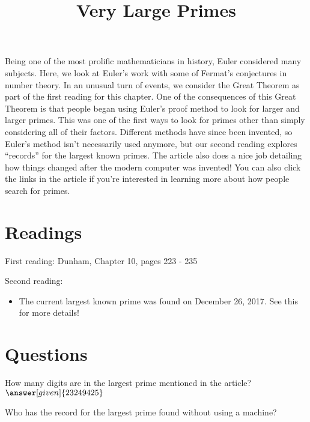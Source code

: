 \documentclass[nooutcomes]{ximera}
\title{Very Large Primes}
\begin{document}
\begin{abstract}
    
\end{abstract}
\maketitle

Being one of the most prolific mathematicians in history, Euler considered many subjects.  Here, we look at Euler's work with some of Fermat's conjectures in number theory.  In an unusual turn of events, we consider the Great Theorem as part of the first reading for this chapter.  One of the consequences of this Great Theorem is that people began using Euler's proof method to look for larger and larger primes.  This was one of the first ways to look for primes other than simply considering all of their factors.  Different methods have since been invented, so Euler's method isn't necessarily used anymore, but our second reading explores ``records'' for the largest known primes.  The article also does a nice job detailing how things changed after the modern computer was invented!  You can also click the links in the article if you're interested in learning more about how people search for primes.


\section{Readings}
First reading: Dunham, Chapter 10, pages 223 - 235

Second reading: 

\begin{itemize}
	\item The current largest known prime was found on December 26, 2017.  See this  for more details!
\end{itemize}



\section{Questions}

\begin{question}
How many digits are in the largest prime mentioned in the article? $\answer[given]{23249425}$
\end{question}

\begin{question}
Who has the record for the largest prime found without using a machine?
\begin{multipleChoice}
\end{multipleChoice}
\end{question}


%
\end{document}
